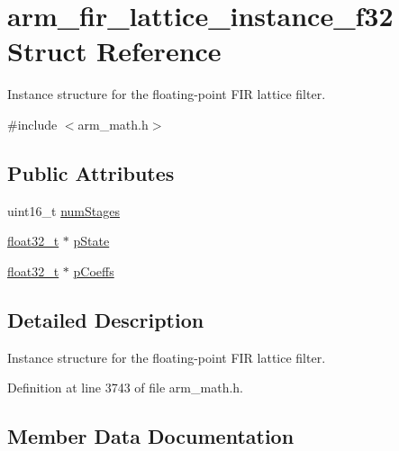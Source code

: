\hypertarget{structarm__fir__lattice__instance__f32}{}\section{arm\+\_\+fir\+\_\+lattice\+\_\+instance\+\_\+f32 Struct Reference}
\label{structarm__fir__lattice__instance__f32}


Instance structure for the floating-\/point F\+IR lattice filter.  




{\ttfamily \#include $<$arm\+\_\+math.\+h$>$}

\subsection*{Public Attributes}
\begin{DoxyCompactItemize}
\item 
uint16\+\_\+t \hyperlink{structarm__fir__lattice__instance__f32_ad369bd9997a250f195254df37408a38f}{num\+Stages}
\item 
\hyperlink{arm__math_8h_a4611b605e45ab401f02cab15c5e38715}{float32\+\_\+t} $\ast$ \hyperlink{structarm__fir__lattice__instance__f32_ae348884a1ba9b83fadccd5da640cbcaf}{p\+State}
\item 
\hyperlink{arm__math_8h_a4611b605e45ab401f02cab15c5e38715}{float32\+\_\+t} $\ast$ \hyperlink{structarm__fir__lattice__instance__f32_a33bf5948c947f9ef80a99717cb0a0a43}{p\+Coeffs}
\end{DoxyCompactItemize}


\subsection{Detailed Description}
Instance structure for the floating-\/point F\+IR lattice filter. 

Definition at line 3743 of file arm\+\_\+math.\+h.



\subsection{Member Data Documentation}
\mbox{\label{structarm__fir__lattice__instance__f32_ad369bd9997a250f195254df37408a38f}} 
